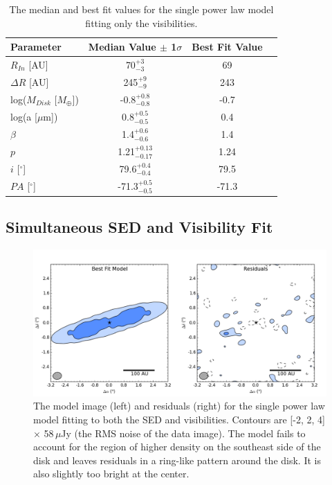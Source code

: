 \begin{table}
\begin{center}
    \def\arraystretch{1.37}%
    \begin{tabular}{l*{2}{c}r}
    \hline
    Parameter & Median Value $\pm$ 1$\sigma$ & Best Fit Value \\ \hline
     $R_{In}$  [AU] & 70$^{+3}_{-3}$ & 69\\  
     $\Delta R$ [AU] & 245$^{+9}_{-9}$ & 243\\ 
     log($M_{Disk}$ [$M_{\oplus}$]) & -0.8$^{+0.8}_{-0.8}$ & -0.7 \\
     log(a [$\mu$m]) & 0.8$^{+0.5}_{-0.5}$ & 0.4\\ 
     $\beta$ & 1.4$^{+0.6}_{-0.6}$ & 1.4\\ 
     $p$ & 1.21$^{+0.13}_{-0.17}$ & 1.24\\ 
     $i$ [$^\circ$] & 79.6$^{+0.4}_{-0.4}$ & 79.5 \\ 
     $PA$ [$^\circ$] & -71.3$^{+0.5}_{-0.5}$ & -71.3\\
    \hline
    \end{tabular}
\end{center}
\caption{The median and best fit values for the single power law model fitting only the visibilities.}
\label{tab:49CET_Simple_Vis_Table}
\end{table}


\subsection{Simultaneous SED and Visibility Fit}
\label{Simple_SED_Vis}

\begin{figure}[t!]
\centering
\includegraphics[width = 1\textwidth]{49CET_Simple_ModelResidual.png}
\caption{The model image (left) and residuals (right) for the single power law model fitting to both the SED and visibilities. Contours are [-2, 2, 4] $\times$ 58$\,\mu$Jy (the RMS noise of the data image). The model fails to account for the region of higher density on the southeast side of the disk and leaves residuals in a ring-like pattern around the disk. It is also slightly too bright at the center.}
\label{fig:49CET_Simple_ModelResidual}
\end{figure}

